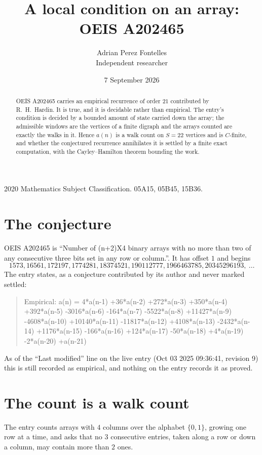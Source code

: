 \documentclass[11pt,a4paper]{article}
\title{A local condition on an array: OEIS A202465}
\author{Adrian Perez Fontelles\\ \small Independent researcher}
\date{7 September 2026}
\theoremstyle{plain}
\theoremstyle{definition}
\begin{document}
\maketitle

\begin{abstract}
OEIS A202465 carries an empirical recurrence of order $21$ contributed by R.~H.~Hardin. It is
true, and it is decidable rather than empirical. The entry's condition is decided by a bounded amount of state carried down the array; the
admissible windows are the vertices of a finite digraph and the arrays counted are exactly the
walks in it. Hence $a(n)$ is a walk count on $S=22$ vertices and is $C$-finite, and whether the
conjectured recurrence annihilates it is settled by a finite exact computation, with the
Cayley--Hamilton theorem bounding the work.
\end{abstract}

\noindent\small 2020 Mathematics Subject Classification. 05A15, 05B45, 15B36.\normalsize

\section{The conjecture}

OEIS A202465 is ``Number of (n+2)X4 binary arrays with no more than two of any consecutive three bits set in any row or column.''. It has offset $1$ and begins
\[
1573, 16561, 172197, 1774281, 18374521, 190112777, 1966463785, 20345296193,\ \dots
\]
The entry states, as a conjecture contributed by its author and never marked settled:
\begin{quote}
Empirical: a(n) = 4*a(n-1) +36*a(n-2) +272*a(n-3) +350*a(n-4) +392*a(n-5) -3016*a(n-6) -164*a(n-7) -5522*a(n-8) +11427*a(n-9) -4608*a(n-10) +10140*a(n-11) -11817*a(n-12) +4108*a(n-13) -2432*a(n-14) +1176*a(n-15) -166*a(n-16) +124*a(n-17) -50*a(n-18) +4*a(n-19) -2*a(n-20) +a(n-21)
\end{quote}
As of the ``Last modified'' line on the live entry (Oct 03 2025 09:36:41, revision 9) this is still
recorded as empirical, and nothing on the entry records it as proved.

\section{The count is a walk count}

The entry counts arrays with $4$ columns over the alphabet $\{0,1\}$, growing one row at a time, and asks that no $3$ consecutive entries, taken along a row or down a column, may contain more than $2$ ones.
\end{document}
